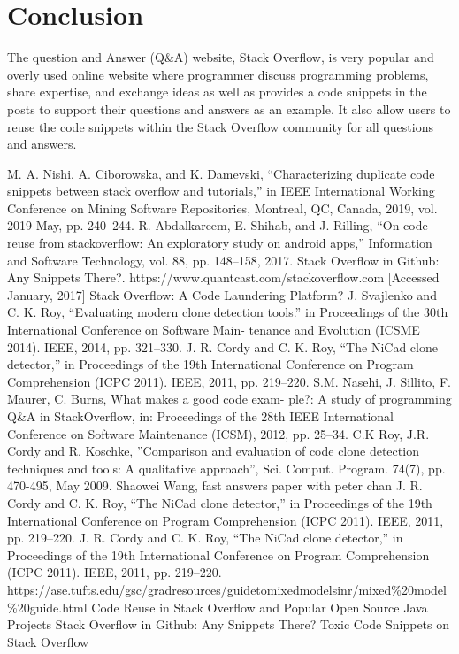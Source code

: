 \documentclass[conference]{IEEEtran}
\begin{document}
\section{Conclusion}
The question and Answer (Q\&A) website, Stack Overflow, is very popular and overly used online website where programmer discuss programming problems, share expertise, and exchange ideas as well as provides  a code snippets in the posts to support their questions and answers as an example. It also allow users to reuse the code snippets within the Stack Overflow community for all questions and answers. 
	
	\begin{thebibliography}{00}
		 M. A. Nishi, A. Ciborowska, and K. Damevski, “Characterizing duplicate code snippets between stack overflow and tutorials,” in IEEE International Working Conference on Mining Software Repositories, Montreal, QC, Canada, 2019, vol. 2019-May, pp. 240–244.
		 R. Abdalkareem, E. Shihab, and J. Rilling, “On code reuse from stackoverflow: An exploratory study on android apps,” Information and Software Technology, vol. 88, pp. 148–158, 2017.
		 Stack Overflow in Github: Any Snippets There?.
		 https://www.quantcast.com/stackoverflow.com [Accessed January, 2017]
		 Stack Overflow: A Code Laundering Platform?
		 J. Svajlenko and C. K. Roy, “Evaluating modern clone detection tools.” in Proceedings of the 30th International Conference on Software Main- tenance and Evolution (ICSME 2014). IEEE, 2014, pp. 321–330.
		 J. R. Cordy and C. K. Roy, “The NiCad clone detector,” in Proceedings of the 19th International Conference on Program Comprehension (ICPC 2011). IEEE, 2011, pp. 219–220.
		 S.M. Nasehi, J. Sillito, F. Maurer, C. Burns, What makes a good code exam- ple?: A study of programming Q\&A in StackOverflow, in: Proceedings of the 28th IEEE International Conference on Software Maintenance (ICSM), 2012, pp. 25–34.
		 C.K Roy, J.R. Cordy and R. Koschke, ”Comparison and evaluation of code clone detection techniques and tools: A qualitative approach”, Sci. Comput. Program. 74(7), pp. 470-495, May 2009.
		 Shaowei Wang, fast answers paper with peter chan
		 J. R. Cordy and C. K. Roy, “The NiCad clone detector,” in Proceedings of the 19th International Conference on Program Comprehension (ICPC 2011). IEEE, 2011, pp. 219–220.
		 J. R. Cordy and C. K. Roy, “The NiCad clone detector,” in Proceedings of the 19th International Conference on Program Comprehension (ICPC 2011). IEEE, 2011, pp. 219–220.
		 https://ase.tufts.edu/gsc/gradresources/guidetomixedmodelsinr/mixed\%20model\%20guide.html
		 Code Reuse in Stack Overflow and Popular Open Source Java Projects
		 Stack Overflow in Github: Any Snippets There?
		 Toxic Code Snippets on Stack Overflow
		
		
	\end{thebibliography}
	
	
\end{document}
